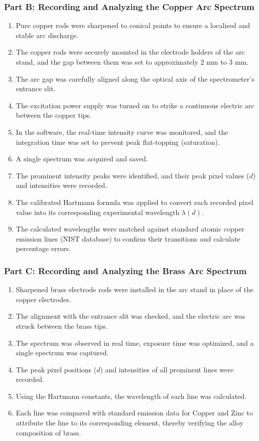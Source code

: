 \documentclass[12pt, a4paper]{article}
\begin{document}
\subsubsection{Part B: Recording and Analyzing the Copper Arc Spectrum}
\begin{enumerate}
    \item Pure copper rods were sharpened to conical points to ensure a localised and stable arc discharge.
    \item The copper rods were securely mounted in the electrode holders of the arc stand, and the gap between them was set to approximately 2 mm to 3 mm.
    \item The arc gap was carefully aligned along the optical axis of the spectrometer's entrance slit.
    \item The excitation power supply was turned on to strike a continuous electric arc between the copper tips.
    \item In the software, the real-time intensity curve was monitored, and the integration time was set to prevent peak flat-topping (saturation).
    \item A single spectrum was acquired and saved.
    \item The prominent intensity peaks were identified, and their peak pixel values ($d$) and intensities were recorded.
    \item The calibrated Hartmann formula was applied to convert each recorded pixel value into its corresponding experimental wavelength $\lambda(d)$.
    \item The calculated wavelengths were matched against standard atomic copper emission lines (NIST database) to confirm their transitions and calculate percentage errors.
\end{enumerate}

\subsubsection{Part C: Recording and Analyzing the Brass Arc Spectrum}
\begin{enumerate}
    \item Sharpened brass electrode rods were installed in the arc stand in place of the copper electrodes.
    \item The alignment with the entrance slit was checked, and the electric arc was struck between the brass tips.
    \item The spectrum was observed in real time, exposure time was optimized, and a single spectrum was captured.
    \item The peak pixel positions ($d$) and intensities of all prominent lines were recorded.
    \item Using the Hartmann constants, the wavelength of each line was calculated.
    \item Each line was compared with standard emission data for Copper and Zinc to attribute the line to its corresponding element, thereby verifying the alloy composition of brass.
\end{enumerate}
\end{document}
